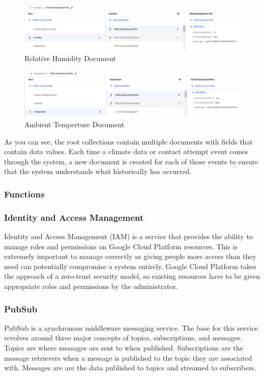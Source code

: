 \documentclass{article}
\begin{document}
\begin{figure}[H]
    \center
    \includegraphics[width=\textwidth]{images/database-humidity.png}
    \caption{Relative Humidity Document}
    \label{fig:humidity}
\end{figure}

\begin{figure}[H]
    \center
    \includegraphics[width=\textwidth]{images/database-temperature.png}
    \caption{Ambient Temperture Document}
    \label{fig:temperature}
\end{figure}

As you can see, the root collections contain multiple documents with fields that contain data values. Each time a climate data or contact attempt event comes through the system, a new document is created for each of those events to ensure that the system understands what historically has occurred.

\subsubsection{Functions}
\label{section:functions}

\subsubsection{Identity and Access Management}
Identity and Access Management (IAM) is a service that provides the ability to manage roles and permissions on Google Cloud Platform resources. This is extremely important to manage correctly as giving people more access than they need can potentially compromise a system entirely. Google Cloud Platform takes the approach of a zero-trust security model, so existing resources have to be given appropriate roles and permissions by the administrator.

\subsubsection{PubSub}
PubSub is a aynchronous middleware messaging service. The base for this service revolves around three major concepts of topics, subscriptions, and messages. Topics are where messages are sent to when published. Subscriptions are the message retrievers when a message is published to the topic they are associated with. Messages are are the data published to topics and streamed to subscribers.
\end{document}

